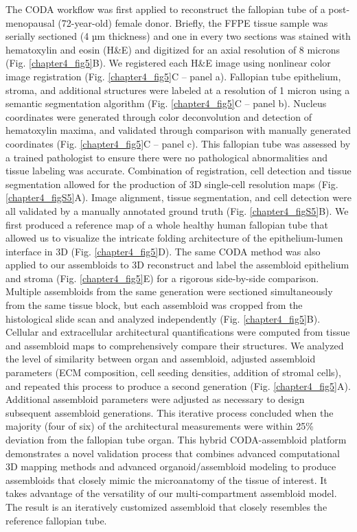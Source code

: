 \begin{refsection}
    The CODA workflow was first applied to reconstruct the fallopian tube of a post-menopausal (72-year-old) female donor. Briefly, the FFPE tissue sample was serially sectioned (4 µm thickness) and one in every two sections was stained with hematoxylin and eosin (H\&E) and digitized for an axial resolution of 8 microns (Fig. \ref{chapter4_fig5}B). We registered each H\&E image using nonlinear color image registration\cite{kiemen2022a} (Fig. \ref{chapter4_fig5}C – panel a). Fallopian tube epithelium, stroma, and additional structures were labeled at a resolution of 1 micron using a semantic segmentation algorithm (Fig. \ref{chapter4_fig5}C – panel b). Nucleus coordinates were generated through color deconvolution and detection of hematoxylin maxima, and validated through comparison with manually generated coordinates\cite{kiemen2022a} (Fig. \ref{chapter4_fig5}C – panel c). This fallopian tube was assessed by a trained pathologist to ensure there were no pathological abnormalities and tissue labeling was accurate. Combination of registration, cell detection and tissue segmentation allowed for the production of 3D single-cell resolution maps (Fig. \ref{chapter4_figS5}A). Image alignment, tissue segmentation, and cell detection were all validated by a manually annotated ground truth (Fig. \ref{chapter4_figS5}B). We first produced a reference map of a whole healthy human fallopian tube that allowed us to visualize the intricate folding architecture of the epithelium-lumen interface in 3D (Fig. \ref{chapter4_fig5}D). 
    The same CODA method was also applied to our assembloids to 3D reconstruct and label the assembloid epithelium and stroma (Fig. \ref{chapter4_fig5}E) for a rigorous side-by-side comparison.  Multiple assembloids from the same generation were sectioned simultaneously from the same tissue block, but each assembloid was cropped from the histological slide scan and analyzed independently (Fig. \ref{chapter4_fig5}B). Cellular and extracellular architectural quantifications were computed from tissue and assembloid maps to comprehensively compare their structures. We analyzed the level of similarity between organ and assembloid, adjusted assembloid parameters (ECM composition, cell seeding densities, addition of stromal cells), and repeated this process to produce a second generation (Fig. \ref{chapter4_fig5}A). Additional assembloid parameters were adjusted as necessary to design subsequent assembloid generations. This iterative process concluded when the majority (four of six) of the architectural measurements were within 25\% deviation from the fallopian tube organ. 
    This hybrid CODA-assembloid platform demonstrates a novel validation process that combines advanced computational 3D mapping methods and advanced organoid/assembloid modeling to produce assembloids that closely mimic the microanatomy of the tissue of interest. It takes advantage of the versatility of our multi-compartment assembloid model. The result is an iteratively customized assembloid that closely resembles the reference fallopian tube. 


\end{refsection}
